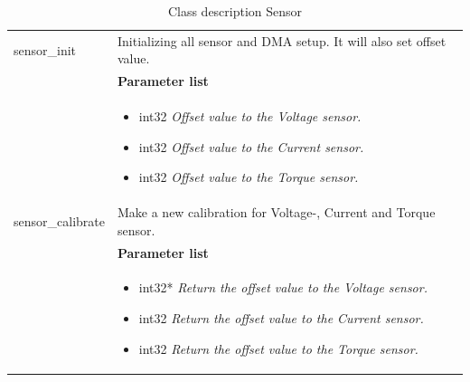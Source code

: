 \begin{table}[H]
\begin{tabular}{|p{5 cm}|p{10 cm}|}
		sensor\_init
		& Initializing all sensor and DMA setup. It will also set offset value.   
		\\ & \textbf{Parameter list}
		\\ & \begin{itemize}
			\item {\large int32}
			\subitem \textit{Offset value to the Voltage sensor.}
			\item {\large int32}
			\subitem \textit{Offset value to the Current sensor.}
			\item {\large int32}
			\subitem \textit{Offset value to the Torque sensor.}
		\end{itemize}
		\\ \hline
		
		sensor\_calibrate
		& Make a new calibration for Voltage-, Current and Torque sensor.    
		\\ & \textbf{Parameter list}
		\\ & \begin{itemize}
			\item {\large int32*}
			\subitem \textit{Return the offset value to the Voltage sensor.}
			\item {\large int32}
			\subitem \textit{Return the offset value to the Current sensor.}
			\item {\large int32}
			\subitem \textit{Return the offset value to the Torque sensor.}
		\end{itemize}
		\\ \hline
		
	\end{tabular}
	\caption{Class description Sensor}
	\label{table:Class_description_Sensor_RR_PSoC}
\end{table}





